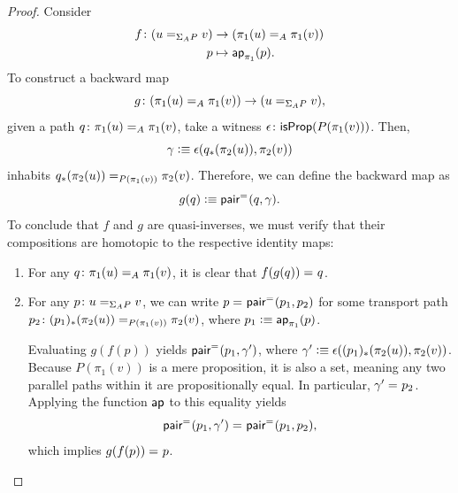 \begin{proof}
    Consider
    \begin{align*}
        f\colon(u\eq{\Sigma_AP}v)&\to(\pi_1(u)\eq A\pi_1(v))\\
        p&\mapsto\fun{ap}_{\pi_1}(p).
    \end{align*}
    To construct a backward map
    \[
        g\colon(\pi_1(u)\eq A\pi_1(v))\to(u\eq{\Sigma_AP}v),
    \]
    given a path $q\colon\pi_1(u)\eq A\pi_1(v)$, take a witness
    $\epsilon\colon\fun{isProp}(P(\pi_1(v)))$.
    Then,
    \[
        \gamma\mathrel{\vcentcolon}\equiv\epsilon(q_*(\pi_2(u)),\pi_2(v))
    \]
    inhabits $q_*(\pi_2(u))\mathrel{=_{P(\pi_1(v))}}\pi_2(v)$. Therefore, we can define the backward map as
    \[
        g(q)\mathrel{\vcentcolon}\equiv\mathsf{pair}^{\mathrel{=_{}}}(q,\gamma).
    \]
    To conclude that $f$ and $g$ are quasi-inverses, we must verify that their compositions are homotopic to the respective identity maps:
    \begin{enumerate}[-]
        \item For any $q\colon\pi_1(u)\eq A\pi_1(v)$, it is clear that $f(g(q))\mathrel{=_{}}q$.
        
        \item For any $p\colon u\eq{\Sigma_AP}v$, we can write $p\mathrel{=_{}} \mathsf{pair}^{\mathrel{=_{}}}(p_1,p_2)$ for some transport path $p_2\colon(p_1)_*(\pi_2(u)) \eq{P(\pi_1(v))} \pi_2(v)$, where $p_1\mathrel{\vcentcolon}\equiv\mathsf{ap}_{\pi_1}(p)$.
        
        Evaluating $g(f(p))$ yields $\mathsf{pair}^{\mathrel{=_{}}}(p_1,\gamma')$, where 
        $\gamma'\mathrel{\vcentcolon}\equiv\epsilon((p_1)_*(\pi_2(u)),\pi_2(v))$. Because $P(\pi_1(v))$ is a mere proposition, it is also a set, meaning any two parallel paths within it are propositionally equal. In particular, $\gamma'\mathrel{=_{}}p_2$. Applying the function $\mathsf{ap}$ to this equality yields 
        \[
            \mathsf{pair}^{\mathrel{=_{}}}(p_1,\gamma')\mathrel{=_{}}\mathsf{pair}^{\mathrel{=_{}}}(p_1,p_2),
        \]
        which implies $g(f(p))\mathrel{=_{}}p$.
    \end{enumerate}
\end{proof}

